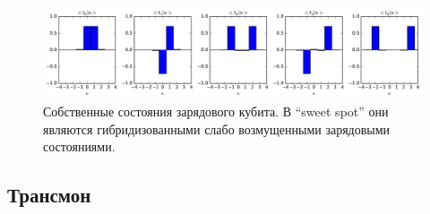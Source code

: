 \documentclass[12pt, twoside]{report}
\numberwithin{equation}{section}
\numberwithin{figure}{section}
\begin{document}
\begin{figure}[!h]
\centering
\includegraphics[width = 1\textwidth]{Pictures2/charge_2_eigenstates}
\caption{Собственные состояния зарядового кубита. В ``sweet spot'' они являются гибридизованными слабо возмущенными зарядовыми состояниями. }
\label{fig:charge-eigenstates}

\end{figure}

\pagebreak
\vfill
\subsection{Трансмон}
\end{document}
